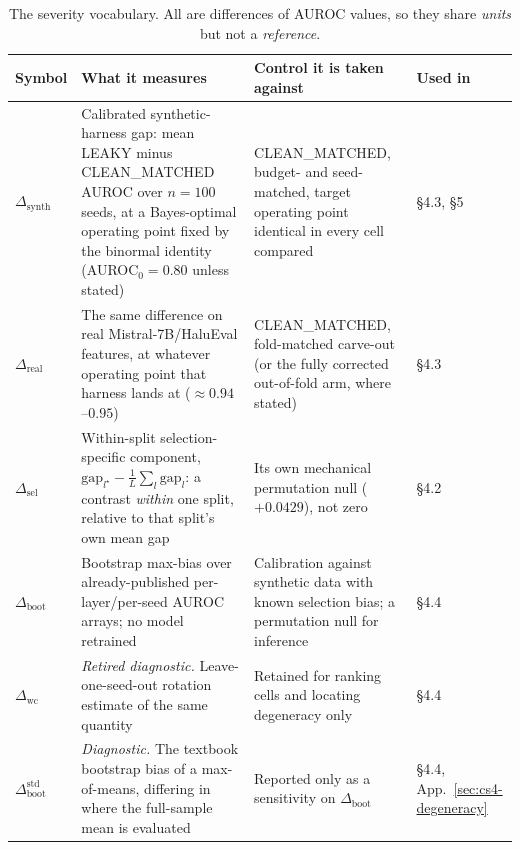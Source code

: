 \documentclass[10pt]{article} %
\begin{document}
\begin{table}[!ht]
\centering
\small
\begin{tabular}{@{}p{}p{}p{}p{}@{}}
\toprule
Symbol & What it measures & Control it is taken against & Used in \\
\midrule
$\Delta_{\text{synth}}$ & Calibrated synthetic-harness gap: mean LEAKY minus CLEAN\_MATCHED AUROC over $n=100$ seeds, at a Bayes-optimal operating point fixed by the binormal identity (AUROC$_0=0.80$ unless stated) & CLEAN\_MATCHED, budget- and seed-matched, target operating point identical in every cell compared & §4.3, §5 \\
\addlinespace
$\Delta_{\text{real}}$ & The same difference on real Mistral-7B/HaluEval features, at whatever operating point that harness lands at ($\approx0.94$--$0.95$) & CLEAN\_MATCHED, fold-matched carve-out (or the fully corrected out-of-fold arm, where stated) & §4.3 \\
\addlinespace
$\Delta_{\text{sel}}$ & Within-split selection-specific component, $\text{gap}_{l^\star}-\frac{1}{L}\sum_l \text{gap}_l$: a contrast \emph{within} one split, relative to that split's own mean gap & Its own mechanical permutation null ($+0.0429$), not zero & §4.2 \\
\addlinespace
$\Delta_{\text{boot}}$ & Bootstrap max-bias over already-published per-layer/per-seed AUROC arrays; no model retrained & Calibration against synthetic data with known selection bias; a permutation null for inference & §4.4 \\
\addlinespace
$\Delta_{\text{wc}}$ & \emph{Retired diagnostic.} Leave-one-seed-out rotation estimate of the same quantity & Retained for ranking cells and locating degeneracy only & §4.4 \\
\addlinespace
$\Delta_{\text{boot}}^{\text{std}}$ & \emph{Diagnostic.} The textbook bootstrap bias of a max-of-means, differing in where the full-sample mean is evaluated & Reported only as a sensitivity on $\Delta_{\text{boot}}$ & §4.4, App.~\ref{sec:cs4-degeneracy} \\
\bottomrule
\end{tabular}
\caption{The severity vocabulary. All are differences of AUROC values, so they
share \emph{units} but not a \emph{reference}.}
\label{tab:delta-vocab}
\end{table}
\end{document}
